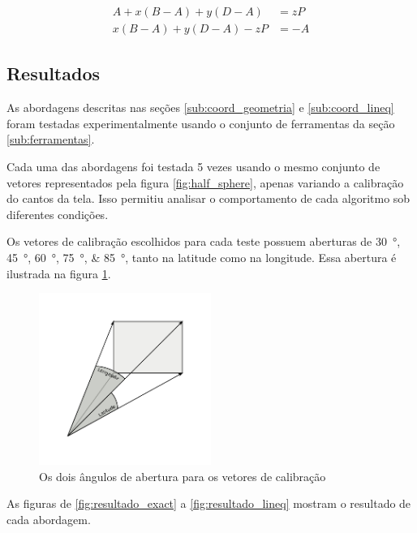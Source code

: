 \documentclass[brazil,pagestart=firstchapter]{abnt}
\begin{document}
\begin{align}
\label{eq:lineq_inicial}
A + x (B-A) + y (D-A) & = z P  \\
\label{eq:lineq_vetorial}
x (B-A) + y (D-A) - z P & = -A
\end{align}



\subsection{Resultados}
\label{sub:coord_resultados}

As abordagens descritas nas seções \ref{sub:coord_geometria} e
\ref{sub:coord_lineq} foram testadas experimentalmente usando o conjunto de
ferramentas da seção \ref{sub:ferramentas}.

Cada uma das abordagens foi testada 5 vezes usando o mesmo conjunto de
vetores representados pela figura \ref{fig:half_sphere}, apenas variando a
calibração do cantos da tela. Isso permitiu analisar o comportamento de cada
algoritmo sob diferentes condições.

Os vetores de calibração escolhidos para cada teste possuem aberturas de
\SIlist{30;45;60;75;85}{\degree}, tanto na latitude como na longitude. Essa
abertura é ilustrada na figura \ref{fig:latitude_longitude}.

\begin{figure}[h]
\centering
\includegraphics[width=0.5\textwidth]{img/latitude_longitude.pdf}
\caption{Os dois ângulos de abertura para os vetores de calibração}
\label{fig:latitude_longitude}
\end{figure}

As figuras de \ref{fig:resultado_exact} a \ref{fig:resultado_lineq} mostram
o resultado de cada abordagem.
\end{document}
